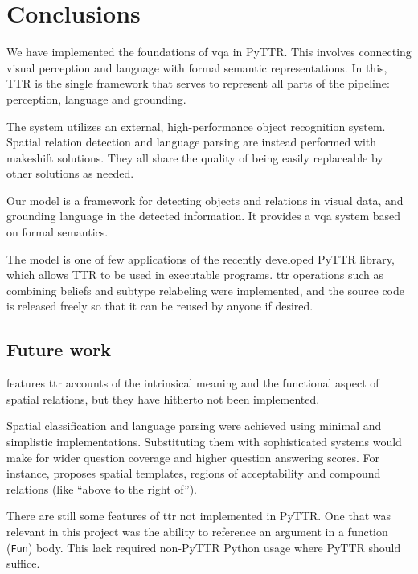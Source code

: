 \section{Conclusions}
\label{sec:conclusions}

We have implemented the foundations of \gls{vqa} in PyTTR.
This involves connecting visual perception and language with formal semantic representations.
In this, TTR is the single framework that serves to represent all parts of the pipeline: perception, language and grounding.

The system utilizes an external, high-performance object recognition system.
Spatial relation detection and language parsing are instead performed with makeshift solutions.
They all share the quality of being easily replaceable by other solutions as needed.

Our model is a framework for detecting objects and relations in visual data, and grounding language in the detected information.
It provides a \gls{vqa} system based on formal semantics.

The model is one of few applications of the recently developed PyTTR library, which allows TTR to be used in executable programs.
\gls{ttr} operations such as combining beliefs and subtype relabeling were implemented, and the source code is released freely so that it can be reused by anyone if desired.



\subsection{Future work}

\cite{ttrspat} features \gls{ttr} accounts of the intrinsical meaning and the functional aspect of spatial relations, but they have hitherto not been implemented.

Spatial classification and language parsing were achieved using minimal and simplistic implementations.
Substituting them with sophisticated systems would make for wider question coverage and higher question answering scores.
For instance, \cite{LoganComputationalAnalysisApprehension1996} proposes spatial templates, regions of acceptability and compound relations (like ``above to the right of'').

There are still some features of \gls{ttr} not implemented in PyTTR.
One that was relevant in this project was the ability to reference an argument in a function ({\tt Fun}) body.
This lack required non-PyTTR Python usage where PyTTR should suffice.


